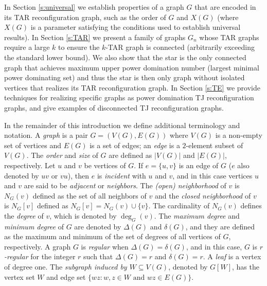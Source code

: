 \documentclass{article}
\numberwithin{figure}{section}   %
\theoremstyle{definition}
\theoremstyle{definition}
\theoremstyle{definition}
\begin{document}
In Section \ref{s:universal} we establish properties of a graph $G$ that are encoded in its TAR reconfiguration graph, such as the order of $G$ and $X(G)$ (where $X(G)$ is a parameter satisfying the conditions used to establish universal results).  In Section \ref{s:TAR} we present a family of graphs $G_n$ whose 
TAR graphs require a large $k$  to ensure the $k$-TAR graph is connected (arbitrarily exceeding the standard lower bound).  We also show that  the star is the only connected graph that achieves maximum upper power domination number (largest  minimal power dominating set) and thus the star is then only graph without isolated vertices that realizes its  TAR reconfiguration graph.  In Section \ref{s:TE} we provide techniques for realizing specific graphs as power domination TJ  reconfiguration  graphs, and give examples of disconnected TJ reconfiguration graphs.




 
In the remainder of this introduction we define additional terminology and notation. A \emph{graph} is a pair $G=(V(G),E(G))$ where $V(G)$ is a non-empty set of vertices and $E(G)$ is a set of edges; an \emph{edge} is a $2$-element subset of $V(G)$. The \emph{order} and \emph{size} of $G$ are  defined as $|V(G)|$ and $|E(G)|$, respectively. Let $u$ and $v$ be vertices of $G$. If $e=\{u,v\}$ is an edge of $G$ ($e$ also denoted by $uv$ or $vu$), then $e$ is \emph{incident} with $u$ and $v$, and in this case vertices $u$ and $v$ are said to be \emph{adjacent} or \emph{neighbors}. The \emph{(open) neighborhood} of $v$ is $N_G(v)$ defined as the set of all neighbors of $v$ and the \emph{closed neighborhood} of $v$ is $N_G[v]$ defined as $N_G[v]=N_G(v)\cup \{v\}$. The cardinality of $N_G(v)$ defines the \emph{degree} of $v$, which is denoted by $\deg_G(v)$. The \emph{maximum degree} and \emph{minimum degree} of $G$ are  denoted by $\Delta(G)$ and $\delta(G)$,  and they are defined as the maximum and minimum of the set of degrees of all vertices of $G$, respectively. A graph $G$ is \emph{regular} when $\Delta(G)=\delta(G)$, and in this case, $G$ is \emph{$r$-regular} for the integer $r$ such that $\Delta(G)=r$ and $\delta(G)=r$.  A \emph{leaf} is a vertex of degree one. The \emph{subgraph induced by $W\subseteq V(G)$}, denoted by $G[W]$, has the vertex set $W$ and edge set $\{wz: w,z\in W\mbox{ and }wz\in E(G)\}$. 
\end{document}
